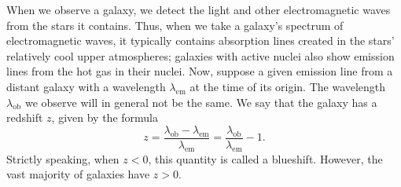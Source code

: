 When we observe a galaxy, we detect the light and other electromagnetic waves from the stars it contains. Thus, when we take a galaxy's spectrum of electromagnetic waves, it typically contains absorption lines created in the stars' relatively cool upper atmospheres; galaxies with active nuclei also show emission lines from the hot gas in their nuclei. Now, suppose a given emission line from a distant galaxy with a wavelength $\lambda_{\mathrm{em}}$ at the time of its origin. The wavelength $\lambda_{\mathrm{ob}}$ we observe will in general not be the same. We say that the galaxy has a redshift $z$, given by the formula
\begin{equation}
	z 
	= \frac{\lambda_{\mathrm{ob}} - \lambda_{\mathrm{em}}}{\lambda_{\mathrm{em}}}
	= \frac{\lambda_{\mathrm{ob}}}{\lambda_{\mathrm{em}}} - 1
	.
	\label{eq:redshift}
\end{equation}
Strictly speaking, when $z<0$, this quantity is called a blueshift. However, the vast majority of galaxies have $z>0$. \cite[§2.3]{Ryden-2017}

